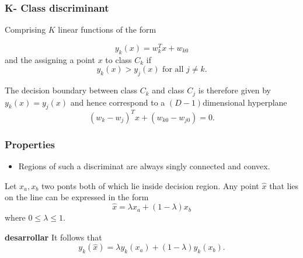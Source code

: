 \begin{frame}
    \frametitle{K- Class discriminant}
Comprising $K$ linear functions of the form 

\begin{equation}
    y_k(x) = w^T_k x + w_{k0}
\end{equation}
and the assigning a point $x$ to class $C_k$
if 
\begin{equation}
    y_k(x) > y_j(x) \text{ for all  } j \neq k.
\end{equation}

The decision boundary between class $C_k$ and class $C_j$ is therefore 
given by $y_k(x) = y_j(x)$ and hence 
correspond to a $(D-1)$dimensional hyperplane 
\begin{equation}
    (w_k - w_j)^T x 
    +
    (w_{k0} - w_{j0})
    = 
    0.
\end{equation}

\end{frame}

\begin{frame}
    \frametitle{Properties}
    \begin{itemize}
        \item Regions of such a discriminat are always singly connected and convex. 
    \end{itemize}
    Let $x_a, x_b$ two ponts both of which lie inside decision region. 
    Any point $\hat x$ that lies on the line 
can be expressed in the form 
\begin{equation}
    \hat x = 
    \lambda x_a +
    (1- \lambda) x_b
\end{equation}
where $0 \leq \lambda \leq 1.$ 

\textbf{desarrollar}
It follows that 
\begin{equation}
    y_k( \hat{x})
    = 
    \lambda y_k(x_a)
    +
    (1- \lambda) y_k(x_b). 
\end{equation}
\end{frame}



